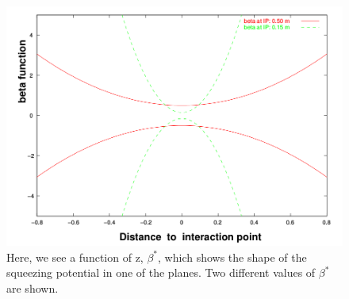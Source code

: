 \begin{figure}
\begin{center}
\includegraphics[width=\linewidth,height=\textheight,keepaspectratio]{./figures/beta_function}
\caption{
Here, we see a function of z, $\beta^{*}$, which shows the shape of the
squeezing potential in one of the planes. Two different values of $\beta^{*}$
are shown.
}
\label{fig:beta_function}
\end{center}
\end{figure}
